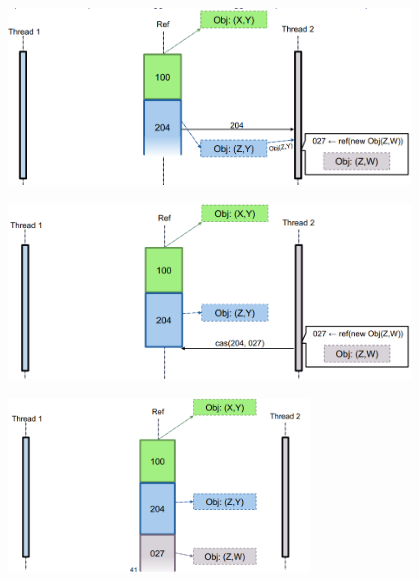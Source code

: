 \documentclass[12pt]{article}
\begin{document}
\begin{center}
    \hfill
    \includegraphics[width = 0.80\textwidth]{Images/100.png}
\end{center}
\begin{center}
    \hfill
    \includegraphics[width = 0.80\textwidth]{Images/101.png}
\end{center}
\begin{center}
    \includegraphics[width = 0.60\textwidth]{Images/102.png}
\end{center}
\end{document}
